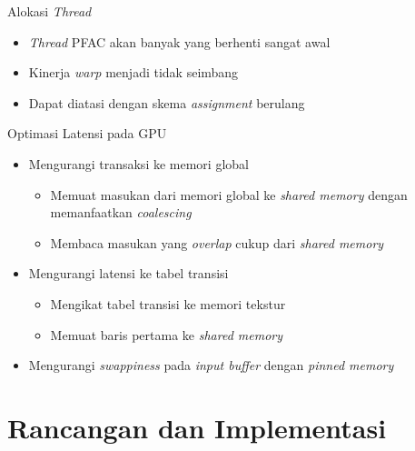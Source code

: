 \documentclass[10pt]{beamer}
\begin{document}
\begin{frame}{Alokasi \emph{Thread}}
    \begin{itemize}

        \item \emph{Thread} PFAC akan banyak yang berhenti sangat awal

        \item Kinerja \emph{warp} menjadi tidak seimbang

        \item Dapat diatasi dengan skema \emph{assignment} berulang

    \end{itemize}
\end{frame}

\begin{frame}{Optimasi Latensi pada GPU}
    \begin{itemize}

        \item Mengurangi transaksi ke memori global
        \begin{itemize}
            \item Memuat masukan dari memori global ke \emph{shared memory} dengan memanfaatkan \emph{coalescing}
            \item Membaca masukan yang \emph{overlap} cukup dari \emph{shared memory}
        \end{itemize}

        \item Mengurangi latensi ke tabel transisi
        \begin{itemize}
            \item Mengikat tabel transisi ke memori tekstur
            \item Memuat baris pertama ke \emph{shared memory}
        \end{itemize}

        \item Mengurangi \emph{swappiness} pada \emph{input buffer} dengan \emph{pinned memory}

    \end{itemize}
\end{frame}

\section{Rancangan dan Implementasi}
\end{document}
